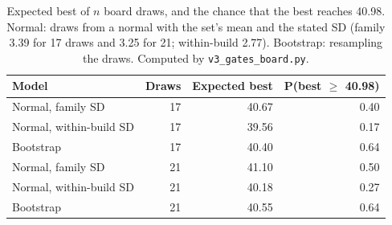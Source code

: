 \begin{table}[t]
\caption{Expected best of $n$ board draws, and the chance that the best reaches 40.98. Normal: draws from a normal with the set's mean and the stated SD (family 3.39 for 17 draws and 3.25 for 21; within-build 2.77). Bootstrap: resampling the draws. Computed by \texttt{v3\_gates\_board.py}.}\label{tab:maxdraws} %
\centering\footnotesize
\begin{tabular}{@{}lrrr@{}}
\toprule
Model & Draws & Expected best & P(best $\geq$ 40.98) \\
\midrule
Normal, family SD & 17 & 40.67 & 0.40 \\
Normal, within-build SD & 17 & 39.56 & 0.17 \\
Bootstrap & 17 & 40.40 & 0.64 \\
Normal, family SD & 21 & 41.10 & 0.50 \\
Normal, within-build SD & 21 & 40.18 & 0.27 \\
Bootstrap & 21 & 40.55 & 0.64 \\
\bottomrule
\end{tabular}
\end{table}
